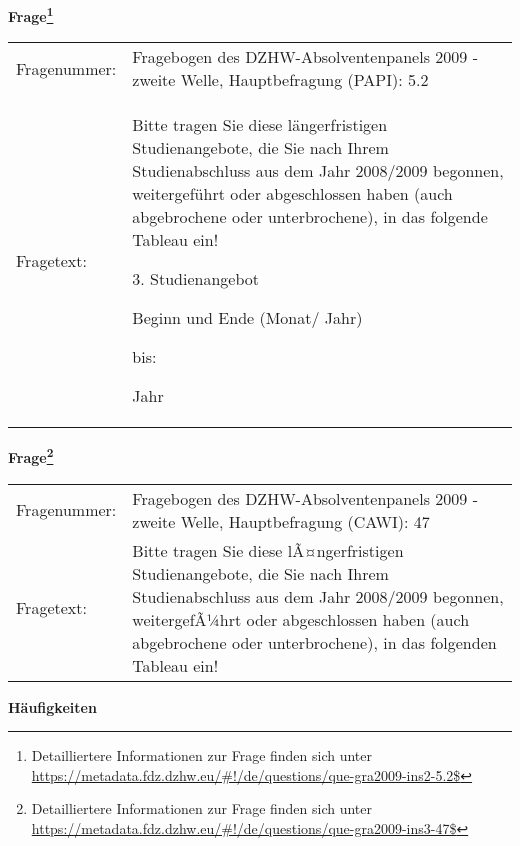 				\vspace*{0.5cm}
                \noindent\textbf{Frage\footnote{Detailliertere Informationen zur Frage finden sich unter
		              \url{https://metadata.fdz.dzhw.eu/\#!/de/questions/que-gra2009-ins2-5.2$}}}\\
				\begin{tabularx}{\hsize}{@{}lX}
					Fragenummer: &
					  Fragebogen des DZHW-Absolventenpanels 2009 - zweite Welle, Hauptbefragung (PAPI):
					  5.2
 \\
					Fragetext: & Bitte tragen Sie diese längerfristigen Studienangebote, die Sie nach Ihrem Studienabschluss aus dem Jahr 2008/2009 begonnen, weitergeführt oder abgeschlossen haben (auch abgebrochene oder unterbrochene), in das folgende Tableau ein!\par  3. Studienangebot\par  Beginn und Ende (Monat/ Jahr)\par  bis:\par  Jahr \\
				\end{tabularx}
				\vspace*{0.5cm}
                \noindent\textbf{Frage\footnote{Detailliertere Informationen zur Frage finden sich unter
		              \url{https://metadata.fdz.dzhw.eu/\#!/de/questions/que-gra2009-ins3-47$}}}\\
				\begin{tabularx}{\hsize}{@{}lX}
					Fragenummer: &
					  Fragebogen des DZHW-Absolventenpanels 2009 - zweite Welle, Hauptbefragung (CAWI):
					  47
 \\
					Fragetext: & Bitte tragen Sie diese lÃ¤ngerfristigen Studienangebote, die Sie nach Ihrem Studienabschluss aus dem Jahr 2008/2009 begonnen, weitergefÃ¼hrt oder abgeschlossen haben (auch abgebrochene oder unterbrochene), in das folgenden Tableau ein! \\
				\end{tabularx}





        		\vspace*{0.5cm}
                \noindent\textbf{Häufigkeiten}

